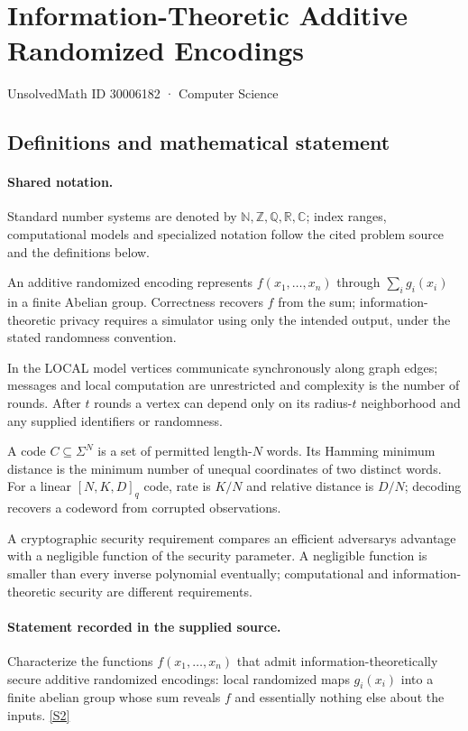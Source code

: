 \documentclass[11pt]{article}
\newcommand{\sref}[2]{\hyperlink{source:#1:#2}{[S#2]}}
\begin{document}
\setcounter{section}{30006181}
\section{Information-Theoretic Additive Randomized Encodings}\label{30006182}
{\small\sffamily UnsolvedMath ID 30006182 · Computer Science}
\subsection{Definitions and mathematical statement}

\paragraph{Shared notation.}Standard number systems are denoted by $\mathbb N,\mathbb Z,\mathbb Q,\mathbb R,\mathbb C$; index ranges, computational models and specialized notation follow the cited problem source and the definitions below.


An additive randomized encoding represents $f(x_1,\ldots,x_n)$ through $\sum_i g_i(x_i)$ in a finite Abelian group. Correctness recovers $f$ from the sum; information-theoretic privacy requires a simulator using only the intended output, under the stated randomness convention.

In the LOCAL model vertices communicate synchronously along graph edges; messages and local computation are unrestricted and complexity is the number of rounds. After $t$ rounds a vertex can depend only on its radius-$t$ neighborhood and any supplied identifiers or randomness.

A code $C\subseteq\Sigma^N$ is a set of permitted length-$N$ words. Its Hamming minimum distance is the minimum number of unequal coordinates of two distinct words. For a linear $[N,K,D]_q$ code, rate is $K/N$ and relative distance is $D/N$; decoding recovers a codeword from corrupted observations.

A cryptographic security requirement compares an efficient adversary\textquotesingle s advantage with a negligible function of the security parameter. A negligible function is smaller than every inverse polynomial eventually; computational and information-theoretic security are different requirements.
\paragraph{Statement recorded in the supplied source.}
Characterize the functions $f(x_1,\ldots,x_n)$ that admit information-theoretically secure additive randomized encodings: local randomized maps $g_i(x_i)$ into a finite abelian group whose sum reveals $f$ and essentially nothing else about the inputs. \sref{30006182}{2}
\end{document}
